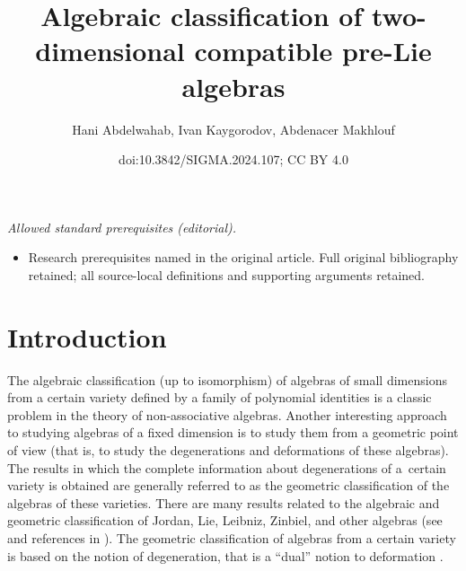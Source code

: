 \documentclass[10pt,a4paper]{amsart}
\title{Algebraic classification of two-dimensional compatible pre-Lie algebras}
\author{Hani Abdelwahab, Ivan Kaygorodov, Abdenacer Makhlouf}
\date{doi:10.3842/SIGMA.2024.107; CC BY 4.0}
\numberwithin{equation}{section}
\begin{document}
\maketitle
\noindent\textit{Allowed standard prerequisites (editorial).}\begin{itemize}
\item Research prerequisites named in the original article. Full original bibliography retained; all source-local definitions and supporting arguments retained.
\end{itemize}\medskip
\section{Introduction}

The algebraic classification (up to isomorphism) of algebras of
small dimensions from a certain variety defined by a family of polynomial identities is a %
classic problem in the theory of non-associative algebras.
Another interesting approach to studying algebras of a fixed dimension is to study them from a geometric point of view (that is, to study the degenerations and deformations of these algebras). The results in which the complete information about degenerations of a~certain variety is obtained are generally referred to as the geometric classification of the algebras of these varieties. There are many results related to the algebraic and geometric classification of
Jordan, Lie, Leibniz, Zinbiel, and other algebras
(see \cite{abcf, fkkv, afm, BB09,BB14, EM22, BT22, GRH, KKL, KV, LLL} and references in \cite{k23,MS,l24}). The geometric classification of algebras from a certain variety is based on the notion of degeneration, that is a ``dual'' notion to deformation \cite{b,D23,EM22,HSZ,lsb20,c}.
\end{document}
